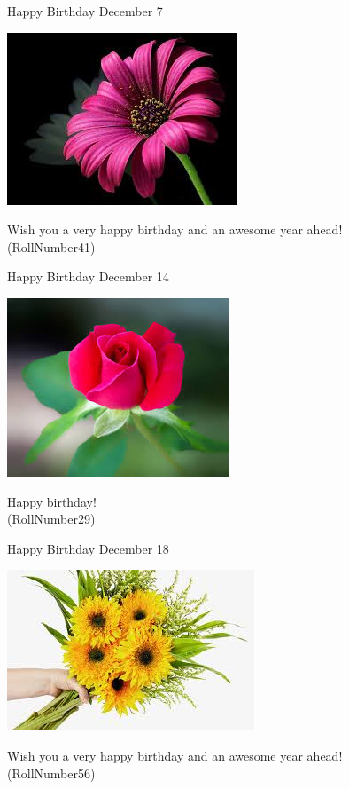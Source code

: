 \documentclass[table, landscape]{beamer}
\begin{document}
\begin{frame}{\color{red}Happy Birthday }
{December 7}
\begin{center}
\includegraphics[height=0.5\textheight]{flowers/f2.jpeg}

Wish you a very happy birthday and an awesome year ahead! \\ \vspace{0.5cm}{\Large name34} (RollNumber41)
\end{center}
\end{frame}
\begin{frame}{\color{blue}Happy Birthday }
{December 14}
\begin{center}
\includegraphics[height=0.5\textheight]{flowers/f3.jpeg}

Happy birthday! \\ \vspace{0.5cm}{\Large name24} (RollNumber29)
\end{center}
\end{frame}
\begin{frame}{\color{blue}Happy Birthday }
{December 18}
\begin{center}
\includegraphics[height=0.5\textheight]{flowers/f6.jpeg}

Wish you a very happy birthday and an awesome year ahead! \\ \vspace{0.5cm}{\Large name49} (RollNumber56)
\end{center}
\end{frame}
\end{document}
